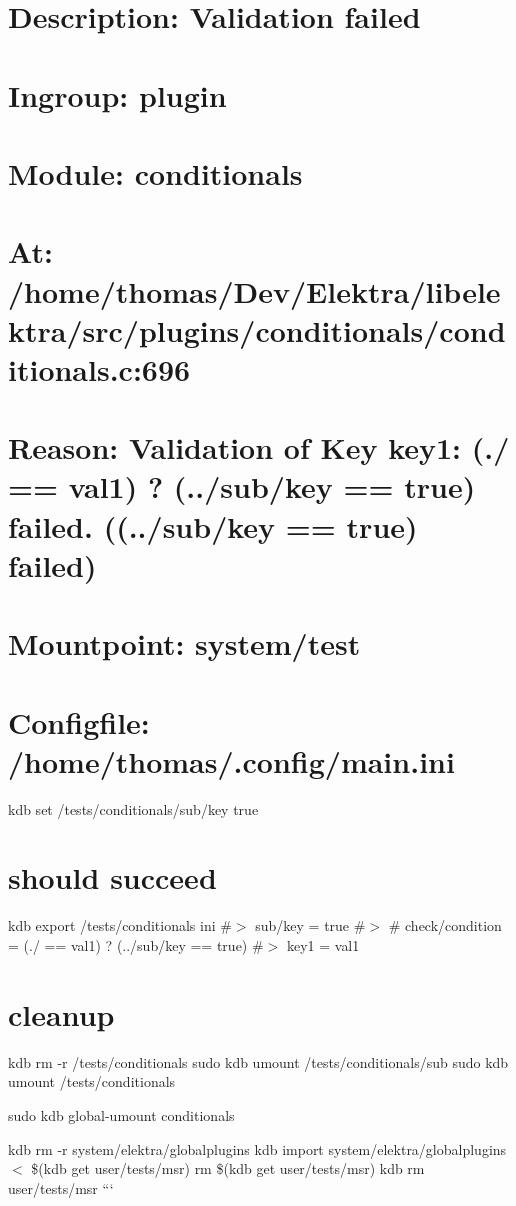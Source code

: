 \section*{Description\+: Validation failed}

\section*{Ingroup\+: plugin}

\section*{Module\+: conditionals}

\section*{At\+: /home/thomas/\+Dev/\+Elektra/libelektra/src/plugins/conditionals/conditionals.c\+:696}

\section*{Reason\+: Validation of Key key1\+: (./ == \textquotesingle{}val1\textquotesingle{}) ? (../sub/key == \textquotesingle{}true\textquotesingle{}) failed. ((../sub/key == \textquotesingle{}true\textquotesingle{}) failed)}

\section*{Mountpoint\+: system/test}

\section*{Configfile\+: /home/thomas/.config/main.\+ini}

kdb set /tests/conditionals/sub/key true

\section*{should succeed}

kdb export /tests/conditionals ini \#$>$ sub/key = true \#$>$ \# check/condition = (./ == \textquotesingle{}val1\textquotesingle{}) ? (../sub/key == \textquotesingle{}true\textquotesingle{}) \#$>$ key1 = val1

\section*{cleanup}

kdb rm -\/r /tests/conditionals sudo kdb umount /tests/conditionals/sub sudo kdb umount /tests/conditionals

sudo kdb global-\/umount conditionals

kdb rm -\/r system/elektra/globalplugins kdb import system/elektra/globalplugins $<$ \$(kdb get user/tests/msr) rm \$(kdb get user/tests/msr) kdb rm user/tests/msr ``` 